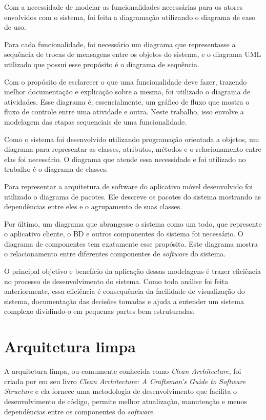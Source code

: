 Com a necessidade de modelar as funcionalidades necessárias para os atores envolvidos com o sistema, foi feita a diagramação utilizando o diagrama de caso de uso.

Para cada funcionalidade, foi necessário um diagrama que representasse a sequência de trocas de mensagens entre os objetos do sistema, e o diagrama UML utilizado que possui esse propósito é o diagrama de sequência.

Com o propósito de esclarecer o que uma funcionalidade deve fazer, trazendo melhor documentação e explicação sobre a mesma, foi utilizado o diagrama de atividades. Esse diagrama é, essencialmente, um gráfico de fluxo que mostra o fluxo de controle entre uma atividade e outra. Neste trabalho, isso envolve a modelagem das etapas sequenciais de uma funcionalidade.

Como o sistema foi desenvolvido utilizando programação orientada a objetos, um diagrama para representar as classes, atributos, métodos e o relacionamento entre elas foi necessário. O diagrama que atende essa necessidade e foi utilizado no trabalho é o diagrama de classes.

Para representar a arquitetura de software do aplicativo móvel desenvolvido foi utilizado o diagrama de pacotes. Ele descreve os pacotes do sistema mostrando as dependências entre eles e o agrupamento de suas classes.

Por último, um diagrama que abrangesse o sistema como um todo, que represente o aplicativo cliente, o BD e outros componentes do sistema foi necessário. O diagrama de componentes tem exatamente esse propósito. Este diagrama mostra o relacionamento entre diferentes componentes de \textit{software} do sistema.

O principal objetivo e benefício da aplicação dessas modelagens é trazer eficiência no processo de desenvolvimento do sistema. Como toda análise foi feita anteriormente, essa eficiência é consequência da facilidade de visualização do sistema, documentação das decisões tomadas e ajuda a entender um sistema complexo dividindo-o em pequenas partes bem estruturadas.

\section{Arquitetura limpa}\label{sec:clean}

A arquitetura limpa, ou comumente conhecida como \textit{Clean Architecture}, foi criada por \textcite{cleanarchitecture} em seu livro \textit{Clean Architecture: A Craftsman’s Guide to Software Structure} e ela fornece uma metodologia de desenvolvimento que facilita o desenvolvimento de código, permite melhor atualização, manutenção e menos dependências entre os componentes do \textit{software}.


